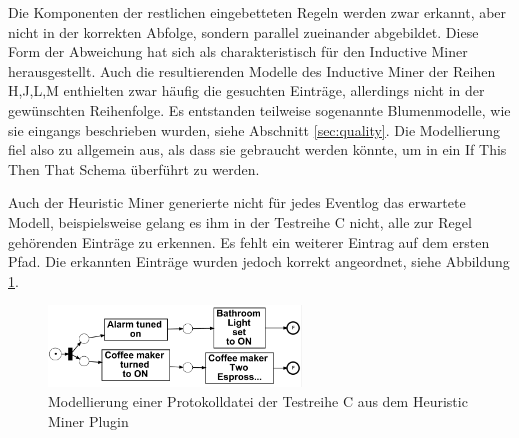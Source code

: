 Die Komponenten der restlichen eingebetteten Regeln werden zwar erkannt, aber nicht in der korrekten Abfolge, sondern parallel zueinander abgebildet. Diese Form der Abweichung hat sich als charakteristisch für den Inductive Miner herausgestellt. Auch die resultierenden Modelle des Inductive Miner der Reihen H,J,L,M enthielten zwar häufig die gesuchten Einträge, allerdings nicht in der gewünschten Reihenfolge. Es entstanden teilweise sogenannte Blumenmodelle, wie sie eingangs beschrieben wurden, siehe Abschnitt \ref{sec:quality}. Die Modellierung fiel also zu allgemein aus, als dass sie gebraucht werden könnte, um in ein If This Then That Schema überführt zu werden.

Auch der Heuristic Miner generierte nicht für jedes Eventlog das erwartete Modell, beispielsweise gelang es ihm in der Testreihe C nicht, alle zur Regel gehörenden Einträge zu erkennen. Es fehlt ein weiterer Eintrag auf dem ersten Pfad. Die erkannten Einträge wurden jedoch korrekt angeordnet, siehe Abbildung \ref{fig:C_heuristic}. 

\begin{figure}[!ht]
    \centering
    \includegraphics[width=0.6\textwidth,]{figures/Appbildungen/C_Heuristic.PNG}
    \caption{Modellierung einer Protokolldatei der Testreihe C aus dem Heuristic Miner Plugin}
    \label{fig:C_heuristic}
\end{figure}

